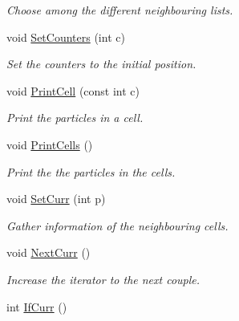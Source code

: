 \begin{DoxyCompactItemize}
\begin{DoxyCompactList}\small\item\em Choose among the different neighbouring lists. \end{DoxyCompactList}\item 
void \hyperlink{classDdDoubleLoop_aadd6f477626e28e8284b9db4649e841d}{Set\+Counters} (int c)
\begin{DoxyCompactList}\small\item\em Set the counters to the initial position. \end{DoxyCompactList}\item 
void \hyperlink{classDdDoubleLoop_af5188eb0e6caae79f8bf349bf2345cf2}{Print\+Cell} (const int c)
\begin{DoxyCompactList}\small\item\em Print the particles in a cell. \end{DoxyCompactList}\item 
void \hyperlink{classDdDoubleLoop_a1132024d8fdd721fd6a36781d4235162}{Print\+Cells} ()
\begin{DoxyCompactList}\small\item\em Print the the particles in the cells. \end{DoxyCompactList}\item 
void \hyperlink{classDdDoubleLoop_a74b7b0d716684a7d46993c83795fd9e7}{Set\+Curr} (int p)\hypertarget{classDdDoubleLoop_a74b7b0d716684a7d46993c83795fd9e7}{}\label{classDdDoubleLoop_a74b7b0d716684a7d46993c83795fd9e7}

\begin{DoxyCompactList}\small\item\em Gather information of the neighbouring cells. \end{DoxyCompactList}\item 
void \hyperlink{classDdDoubleLoop_a42eeb7049c078ca89057fbc08726eded}{Next\+Curr} ()\hypertarget{classDdDoubleLoop_a42eeb7049c078ca89057fbc08726eded}{}\label{classDdDoubleLoop_a42eeb7049c078ca89057fbc08726eded}

\begin{DoxyCompactList}\small\item\em Increase the iterator to the next couple. \end{DoxyCompactList}\item 
int \hyperlink{classDdDoubleLoop_a63c5d18d3a487d1a8ab2a5881c6acb38}{If\+Curr} ()\hypertarget{classDdDoubleLoop_a63c5d18d3a487d1a8ab2a5881c6acb38}{}\label{classDdDoubleLoop_a63c5d18d3a487d1a8ab2a5881c6acb38}


\end{DoxyCompactItemize}
